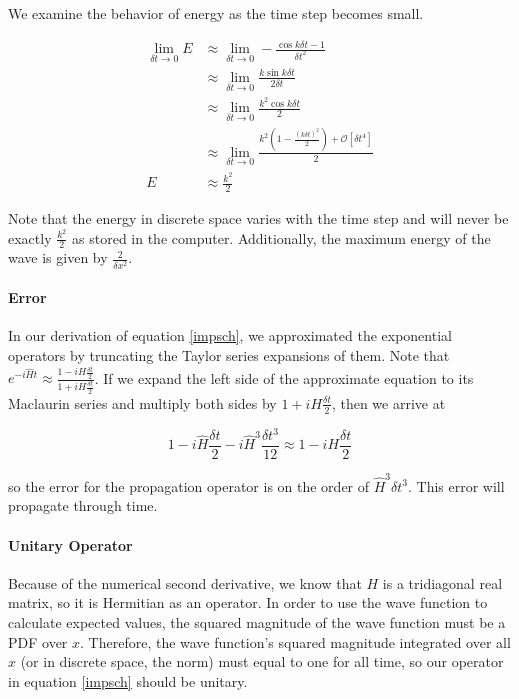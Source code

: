\documentclass[letterpaper,12pt]{article}
\begin{document}
    \pagebreak

    We examine the behavior of energy as the time step becomes small.

    \begin{align}
        \lim_{\delta t \to 0} E
        &\approx
        \lim_{\delta t \to 0} -\frac{\cos{k\delta t} - 1}{\delta t^2}
        \nonumber
        \\
        &\approx \lim_{\delta t \to 0} \frac{k\sin{k\delta t}}{2\delta t}
        \nonumber
        \\
        &\approx \lim_{\delta t \to 0} \frac{k^2\cos{k\delta t}}{2}
        \nonumber
        \\
        &\approx \lim_{\delta t \to 0}
        \frac{k^2 \left( 1 - \frac{(k\delta t) ^ 2}{2} \right) +
        \mathcal{O}\left[\delta t^4\right]}{2}
        \nonumber
        \\
        E &\approx \frac{k^2}{2}
        \label{eq:EnoV}
    \end{align}

    Note that the energy in discrete space varies with the time step and will
    never be exactly $\frac{k^2}{2}$ as stored in the computer. Additionally,
    the maximum energy of the wave is given by $\frac{2}{\delta x^2}$.

    \paragraph{Error} In our derivation of equation \eqref{impsch}, we
    approximated the exponential operators by truncating the Taylor series
    expansions of them. Note that $e^{-i\hat{H}t} \approx
    \frac{1 - iH\frac{\delta t}{2}}{1 + iH\frac{\delta t}{2}}$. If we expand the
    left side of the approximate equation to its Maclaurin series and multiply
    both sides by $1 + iH\frac{\delta t}{2}$, then we arrive at

    \[
        1 - i\hat{H}\frac{\delta t}{2} - i\hat{H}^3\frac{\delta t^3}{12}
        \approx
        1 - iH\frac{\delta t}{2}
    \]

    so the error for the propagation operator is on the order of $\hat{H}^3
    \delta t^3$. This error will propagate through time.

    \paragraph{Unitary Operator} Because of the numerical second derivative, we
    know that $H$ is a tridiagonal real matrix, so it is Hermitian as an
    operator. In order to use the wave function to calculate expected values,
    the squared magnitude of the wave function must be a PDF over $x$.
    Therefore, the wave function's squared magnitude integrated over all $x$ (or
    in discrete space, the norm) must equal to one for all time, so our operator
    in equation \eqref{impsch} should be unitary.
\end{document}
